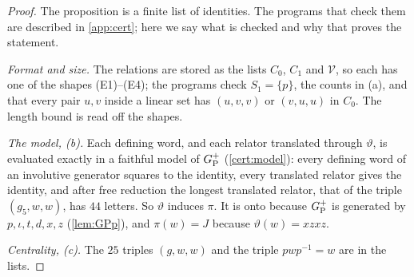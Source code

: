 \begin{proof}
The proposition is a finite list of identities. The programs that check them are described in \cref{app:cert}; here we say what is
checked and why that proves the statement.

\emph{Format and size.} The relations are stored as the lists $C_0$, $C_1$ and $\mathcal V$, so each has one of the shapes (E1)--(E4); the
programs check $S_1=\{p\}$, the counts in (a), and that every pair $u,v$ inside a linear set has $(u,v,v)$ or $(v,u,u)$ in $C_0$. The
length bound is read off the shapes.

\emph{The model, (b).} Each defining word, and each relator translated through $\vartheta$, is evaluated exactly in a faithful model of
$G_{\mathrm P}^{+}$ (\cref{cert:model}): every defining word of an involutive generator squares to the identity, every translated relator gives the
identity, and after free reduction the longest translated relator, that of the triple $(g_5,w,w)$, has $44$ letters. So $\vartheta$
induces $\pi$. It is onto because $G_{\mathrm P}^{+}$ is generated by $p,\iota,t,d,x,z$ (\cref{lem:GPp}), and $\pi(w)=J$ because $\vartheta(w)=xzxz$.

\emph{Centrality, (c).} The $25$ triples $(g,w,w)$ and the triple $pwp^{-1}=w$ are in the lists.


\end{proof}
